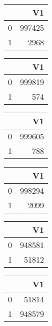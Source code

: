 \bigskip\bigskip
\centering
\begin{tabular}{rr}
  \hline
 & V1 \\ 
  \hline
0 & 997425 \\ 
  1 & 2968 \\ 
   \hline
\end{tabular}

\bigskip\bigskip
\centering
\begin{tabular}{rr}
  \hline
 & V1 \\ 
  \hline
0 & 999819 \\ 
  1 & 574 \\ 
   \hline
\end{tabular}

\bigskip\bigskip
\centering
\begin{tabular}{rr}
  \hline
 & V1 \\ 
  \hline
0 & 999605 \\ 
  1 & 788 \\ 
   \hline
\end{tabular}

\bigskip\bigskip
\centering
\begin{tabular}{rr}
  \hline
 & V1 \\ 
  \hline
0 & 998294 \\ 
  1 & 2099 \\ 
   \hline
\end{tabular}

\bigskip\bigskip
\centering
\begin{tabular}{rr}
  \hline
 & V1 \\ 
  \hline
0 & 948581 \\ 
  1 & 51812 \\ 
   \hline
\end{tabular}

\bigskip\bigskip
\centering
\begin{tabular}{rr}
  \hline
 & V1 \\ 
  \hline
0 & 51814 \\ 
  1 & 948579 \\ 
   \hline
\end{tabular}

